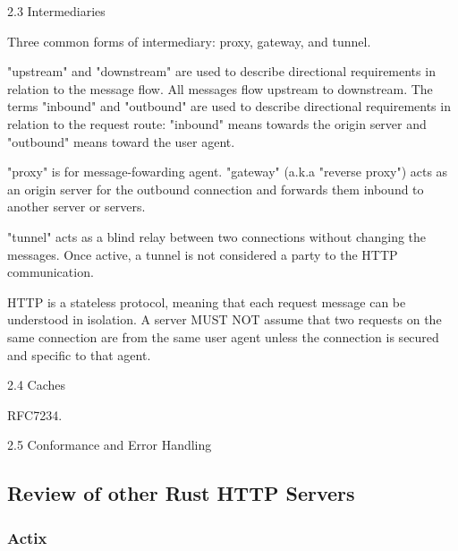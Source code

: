 \documentclass[12pt, a4paper]{article}
\begin{document}
2.3 Intermediaries

Three common forms of intermediary: proxy, gateway, and tunnel.

"upstream" and "downstream" are used to describe directional requirements in relation to the
message flow. All messages flow upstream to downstream. The terms "inbound" and "outbound" are
used to describe directional requirements in relation to the request route: "inbound" means
towards the origin server and "outbound" means toward the user agent.

"proxy" is for message-fowarding agent.
"gateway" (a.k.a "reverse proxy") acts as an origin server for the outbound connection and
forwards them inbound to another server or servers.

"tunnel" acts as a blind relay between two connections without changing the messages.
Once active, a tunnel is not considered a party to the HTTP communication.

HTTP is a stateless protocol, meaning that each request message can be understood in isolation.
A server MUST NOT assume that two requests on the same connection are from the same user
agent unless the connection is secured and specific to that agent.

2.4 Caches

RFC7234.

2.5 Conformance and Error Handling


\subsection{Review of other Rust HTTP Servers}

\subsubsection{Actix}

    
\printbibliography
\end{document}
